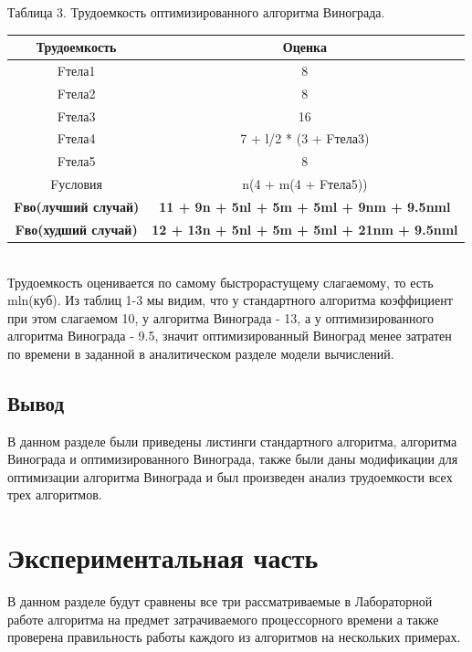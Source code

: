 \documentclass[a4paper, 14pt]{article}
\begin{document}
        	\begin{center}
  	Таблица 3. Трудоемкость оптимизированного алгоритма Винограда.\\
	\end{center}        \begin{tabular}{ | c | c | }
        \hline
		Трудоемкость & Оценка\\ \hline
		Fтела1 & 8\\ \hline
		Fтела2 & 8\\ \hline
		Fтела3 & 16\\ \hline
		Fтела4 & 7 + l/2 * (3 + Fтела3)\\ \hline
		Fтела5 & 8\\ \hline
		Fусловия &  n(4 + m(4 + Fтела5)) \\ \hline
		\textbf{Fво(лучший случай)} & \textbf{11 + 9n + 5nl + 5m + 5ml + 9nm + 9.5nml}\\ \hline
		\textbf{Fво(худший случай)} & \textbf{12 + 13n + 5nl + 5m + 5ml + 21nm + 9.5nml}\\ \hline
		\hline
        \end{tabular}\\
	Трудоемкость оценивается по самому быстрорастущему слагаемому, то есть mln(куб). Из таблиц 1-3 мы видим, что у стандартного алгоритма коэффициент при этом слагаемом 10, у алгоритма Винограда - 13, а у оптимизированного алгоритма Винограда - 9.5, значит оптимизированный Виноград менее затратен по времени в заданной в аналитическом разделе модели вычислений.
   \subsection{Вывод} 
   В данном разделе были приведены листинги стандартного алгоритма, алгоритма Винограда и оптимизированного Винограда, также были даны модификации для оптимизации алгоритма Винограда и был произведен анализ трудоемкости всех трех алгоритмов.
	 
    
       	\newpage
       	
        \section{Экспериментальная часть}
        В данном разделе будут сравнены все три рассматриваемые в Лабораторной работе алгоритма на предмет затрачиваемого процессорного времени а также проверена правильность работы каждого из алгоритмов на нескольких примерах.
\end{document}

